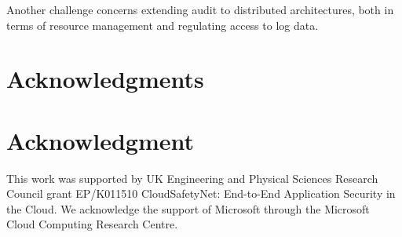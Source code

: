\documentclass[10pt,journal,compsoc]{IEEEtran}
\begin{document}
Another challenge concerns extending audit to distributed architectures, both in terms of resource management  and regulating access to log data.


 
\ifCLASSOPTIONcompsoc
    \section*{Acknowledgments}
\else
    \section*{Acknowledgment}
\fi
\noindent This work was supported by UK Engineering and Physical Sciences Research Council grant EP/K011510 CloudSafetyNet: End-to-End Application Security in the Cloud. We acknowledge the support of Microsoft 
through the Microsoft Cloud Computing Research Centre. 
 


\end{document}
